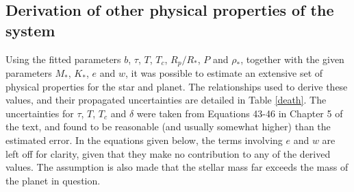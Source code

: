 \documentclass[10pt, preprint]{aastex}
\begin{document}
\subsection{Derivation of other physical properties of the system}
Using the fitted parameters $b$, $\tau$, $T$, $T_c$, $R_p/R_*$, $P$ and $\rho_*$, together with the given parameters $M_*$, $K_*$, $e$ and $w$, it was possible to estimate an extensive set of physical properties for the star and planet. The relationships used to derive these values, and their propagated uncertainties are detailed in Table \ref{death}. The uncertainties for $\tau$, $T$, $T_c$ and $\delta$ were taken from Equations 43-46 in Chapter 5 of the text, and found to be reasonable (and usually somewhat higher) than the estimated error. In the equations given below, the terms involving $e$ and $w$ are left off for clarity, given that they make no contribution to any of the derived values. The assumption is also made that the stellar mass far exceeds the mass of the planet in question.
\end{document}
